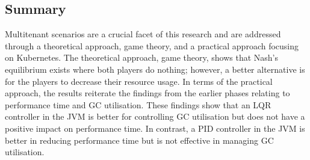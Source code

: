 \subsection{Summary}

Multitenant scenarios are a crucial facet of this research and are
addressed through a theoretical approach, game theory, and a practical
approach focusing on Kubernetes. The theoretical approach, game theory,
shows that Nash's equilibrium exists where both players do nothing;
however, a better alternative is for the players to decrease their
resource usage. In terms of the practical approach, the results
reiterate the findings from the earlier phases relating to performance
time and GC utilisation. These findings show that an LQR controller in
the JVM is better for controlling GC utilisation but does not have a
positive impact on performance time. In contrast, a PID controller in the
JVM is better in reducing performance time but is not effective in
managing GC utilisation.


